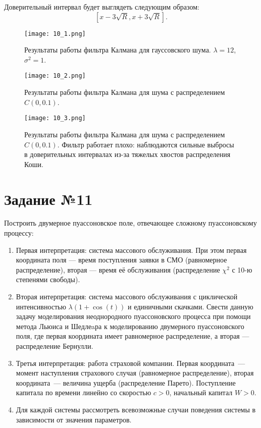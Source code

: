 \documentclass[a4paper, 11pt]{article}
\theoremstyle{def}
\theoremstyle{th}
\theoremstyle{rem}
\begin{document}
Доверительный интервал будет выглядеть следующим образом:
$$
[x-3\sqrt{R}, x+3\sqrt{R}].
$$

\begin{figure}[H]
        \centering
        \texttt{[image: 10\_1.png]}
        \caption{Результаты работы фильтра Калмана для гауссовского шума. $\lambda = 12$, $\sigma^2 = 1$.}
\end{figure}
\begin{figure}[H]
        \centering
        \texttt{[image: 10\_2.png]}
        \caption{Результаты работы фильтра Калмана для шума с распределением $C(0, 0.1)$.}
\end{figure}
\begin{figure}[H]
        \centering
        \texttt{[image: 10\_3.png]}
        \caption{Результаты работы фильтра Калмана для шума с распределением $C(0, 0.1)$. Фильтр работает плохо: наблюдаются сильные выбросы в доверительных интервалах из-за тяжелых хвостов распределения Коши. }
\end{figure}
\clearpage



\section{Задание №11}

Построить двумерное пуассоновское поле, отвечающее сложному пуассоновскому процессу:
\begin{enumerate}
        \item Первая интерпретация: система массового обслуживания. При этом первая координата поля --- время поступления заявки в СМО (равномерное распределение), вторая --- время её обслуживания (распределение $\chi^2$ с 10-ю степенями свободы).
        \item Вторая интерпретация: система массового обслуживания с циклической интенсивностью $\lambda (1 + \cos(t))$ и единичными скачками. Свести данную задачу моделирования неоднородного пуассоновского процесса при помощи метода Льюиса и Шедлеaра к моделированию двумерного пуассоновского поля, где первая координата имеет равномерное распределение, а вторая --- распределение Бернулли.
        \item Третья интерпретация: работа страховой компании. Первая координата~--- момент наступления страхового случая (равномерное распределение), вторая координата~--- величина ущерба (распределение Парето). Поступление капитала по времени линейно со скоростью $c > 0$, начальный капитал $W > 0$.
        \item Для каждой системы рассмотреть всевозможные случаи поведения системы в зависимости от значения параметров.
\end{enumerate}
\end{document}
